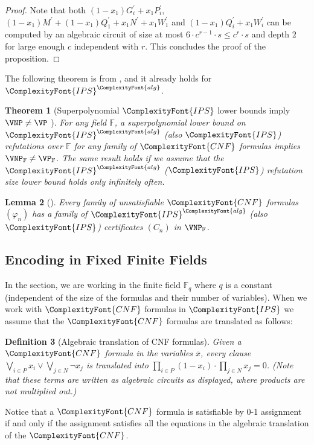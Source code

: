 \documentclass[11pt,letter]{article}
\newtheorem{theorem}{Theorem}[section]
\newtheorem{lemma}[theorem]{Lemma}
\newtheorem{definition}[theorem]{Definition}
\theoremstyle{remark} %
\newcommand{\alg}{\ComplexityFont{alg}}
\newcommand{\IPS}{%
    {
        \ComplexityFont{IPS} 
    }
}
\newcommand{\CNF}{ %
    {
        \ComplexityFont{CNF}
    }
}
\begin{document}
{\begin{proof}
        Note that both $(1-x_1)  G_i^\prime + x_1  P_i^\prime$, $(1-x_1)  M^\prime + (1-x_1) Q_1^\prime + x_1 N^\prime + x_1 W_1^\prime$ and $(1-x_1) Q_i^\prime + x_1 W_i^\prime$ can be computed by an algebraic circuit of size at most $6 \cdot c^{r-1} \cdot s \leq c^r \cdot s$ and depth $2$ for large enough $c$ independent with $r$. This concludes the proof of the proposition.
    \end{proof}

    
    The following theorem is from \cite{GP18}, and it already holds for $\IPS^\alg$.
    \begin{theorem}[Superpolynomial $\IPS$ lower bounds imply $\VNP \neq \VP$ \cite{GP18}]
        \label{theorem: IPS lower bound implies VNP neq VP}
        For any field $\mathbb{F}$, a superpolynomial lower bound on $\IPS^\alg$ (also $\IPS$) refutations over $\mathbb{F}$ for any family of $\CNF$ formulas implies $\VNP_\mathbb{F} \neq \VP_\mathbb{F}$. The same result holds if we assume that the $\IPS^\alg$ ($\IPS$) refutation size lower bound holds only infinitely often. 
    \end{theorem}
    \begin{lemma}[\cite{GP18}]
        \label{lemma: unsat CNF has VNP refutation}
        Every family of unsatisfiable $\CNF$ formulas $(\varphi_n)$ has a family of $\IPS^\alg$ (also $\IPS$) certificates $(C_n)$ in $\VNP_\mathbb{F}$.
    \end{lemma}

    \subsection{Encoding in Fixed Finite Fields}


    In the section, we are working in the finite field $\mathbb{F}_q$ where $q$ is a constant (independent of the size of the formulas and their number of variables). When we work with $\CNF$ formulas in $\IPS$ we assume that the $\CNF$ formulas are translated as follows:
    \begin{definition}[Algebraic translation of CNF formulas]
        \label{def: Algebraic translation of CNF formulas}
        Given a $\CNF$ formula in the variables $\overline{x}$, every clause $\bigvee_{i \in P}x_i \lor \bigvee_{j \in N} \neg x_j$ is translated into $\prod_{i \in P}(1-x_i) \cdot \prod_{j \in N}x_j=0$. (Note that these terms are written as algebraic circuits as displayed, where products are not multiplied out.)
    \end{definition}
    Notice that a $\CNF$ formula is satisfiable by 0-1 assignment if and only if the assignment satisfies all the equations in the algebraic translation of the $\CNF$.\par
    
}
\end{document}
